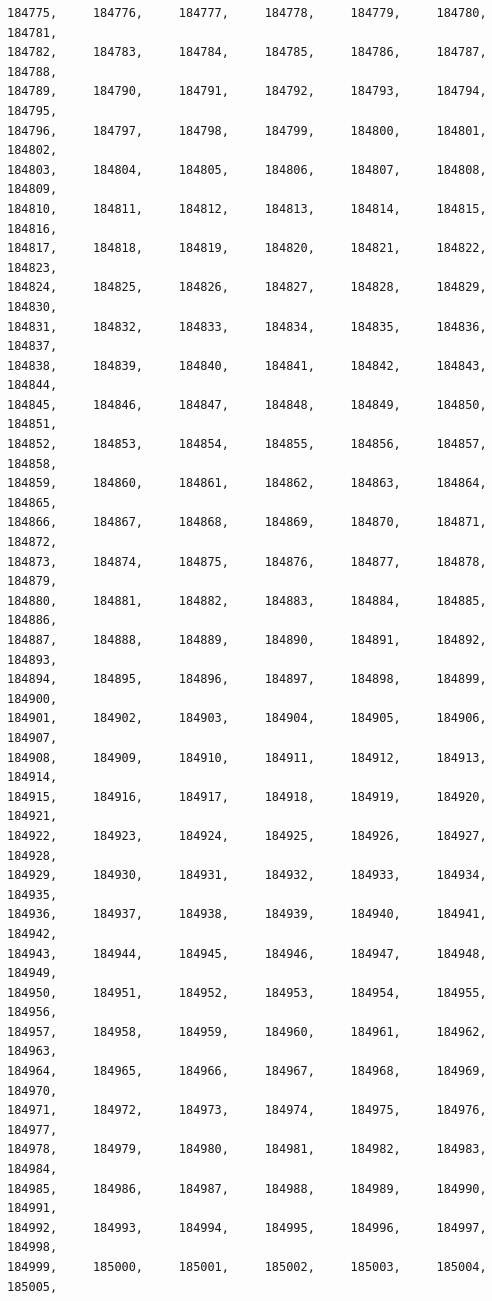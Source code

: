 \documentclass[a4paper,11pt]{report}
\begin{document}
\begin{verbatim}
184775,     184776,     184777,     184778,     184779,     184780,     184781,
184782,     184783,     184784,     184785,     184786,     184787,     184788,
184789,     184790,     184791,     184792,     184793,     184794,     184795,
184796,     184797,     184798,     184799,     184800,     184801,     184802,
184803,     184804,     184805,     184806,     184807,     184808,     184809,
184810,     184811,     184812,     184813,     184814,     184815,     184816,
184817,     184818,     184819,     184820,     184821,     184822,     184823,
184824,     184825,     184826,     184827,     184828,     184829,     184830,
184831,     184832,     184833,     184834,     184835,     184836,     184837,
184838,     184839,     184840,     184841,     184842,     184843,     184844,
184845,     184846,     184847,     184848,     184849,     184850,     184851,
184852,     184853,     184854,     184855,     184856,     184857,     184858,
184859,     184860,     184861,     184862,     184863,     184864,     184865,
184866,     184867,     184868,     184869,     184870,     184871,     184872,
184873,     184874,     184875,     184876,     184877,     184878,     184879,
184880,     184881,     184882,     184883,     184884,     184885,     184886,
184887,     184888,     184889,     184890,     184891,     184892,     184893,
184894,     184895,     184896,     184897,     184898,     184899,     184900,
184901,     184902,     184903,     184904,     184905,     184906,     184907,
184908,     184909,     184910,     184911,     184912,     184913,     184914,
184915,     184916,     184917,     184918,     184919,     184920,     184921,
184922,     184923,     184924,     184925,     184926,     184927,     184928,
184929,     184930,     184931,     184932,     184933,     184934,     184935,
184936,     184937,     184938,     184939,     184940,     184941,     184942,
184943,     184944,     184945,     184946,     184947,     184948,     184949,
184950,     184951,     184952,     184953,     184954,     184955,     184956,
184957,     184958,     184959,     184960,     184961,     184962,     184963,
184964,     184965,     184966,     184967,     184968,     184969,     184970,
184971,     184972,     184973,     184974,     184975,     184976,     184977,
184978,     184979,     184980,     184981,     184982,     184983,     184984,
184985,     184986,     184987,     184988,     184989,     184990,     184991,
184992,     184993,     184994,     184995,     184996,     184997,     184998,
184999,     185000,     185001,     185002,     185003,     185004,     185005,

\end{verbatim}
\end{document}
